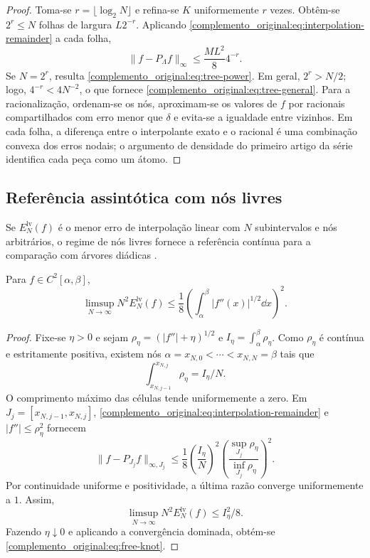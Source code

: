 \begin{proof}
Toma-se $r=\lfloor\log_2N\rfloor$ e refina-se $K$ uniformemente $r$ vezes. Obtêm-se $2^r\le N$ folhas de largura $L2^{-r}$. Aplicando \eqref{complemento_original:eq:interpolation-remainder} a cada folha,
\[
 \|f-P_\Lambda f\|_\infty\le\frac{ML^2}{8}4^{-r}.
\]
Se $N=2^r$, resulta \eqref{complemento_original:eq:tree-power}. Em geral, $2^r>N/2$; logo, $4^{-r}<4N^{-2}$, o que fornece \eqref{complemento_original:eq:tree-general}. Para a racionalização, ordenam-se os nós, aproximam-se os valores de $f$ por racionais compartilhados com erro menor que $\delta$ e evita-se a igualdade entre vizinhos. Em cada folha, a diferença entre o interpolante exato e o racional é uma combinação convexa dos erros nodais; o argumento de densidade do primeiro artigo da série identifica cada peça como um átomo.
\end{proof}

\subsection{Referência assintótica com nós livres}

Se $E_N^{\mathrm{lv}}(f)$ é o menor erro de interpolação linear com $N$
subintervalos e nós arbitrários, o regime de nós livres fornece a referência
contínua para a comparação com árvores diádicas
\citep{artigo_1-deboor1973,artigo_1-burchard1974,artigo_1-deboor2001,artigo_1-powell1981,artigo_1-schumaker2007}.

\begin{theorem}\label{map:complemento_original:6.2}\label{complemento_original:thm:free-knots}
Para $f\in C^2[\alpha,\beta]$,
\begin{equation}
 \limsup_{N\to\infty}N^2E_N^{\mathrm{lv}}(f)
 \le\frac18\left(\int_\alpha^\beta |f''(x)|^{1/2}\dd x\right)^2.
 \label{complemento_original:eq:free-knot}
\end{equation}
\end{theorem}

\begin{proof}
Fixe-se $\eta>0$ e sejam $\rho_\eta=(|f''|+\eta)^{1/2}$ e $I_\eta=\int_\alpha^\beta\rho_\eta$. Como $\rho_\eta$ é contínua e estritamente positiva, existem nós $\alpha=x_{N,0}<\cdots<x_{N,N}=\beta$ tais que
\[
 \int_{x_{N,j-1}}^{x_{N,j}}\rho_\eta=I_\eta/N.
\]
O comprimento máximo das células tende uniformemente a zero. Em $J_j=[x_{N,j-1},x_{N,j}]$, \eqref{complemento_original:eq:interpolation-remainder} e $|f''|\le\rho_\eta^2$ fornecem
\[
 \|f-P_{J_j}f\|_{\infty,J_j}
 \le\frac18\left(\frac{I_\eta}{N}\right)^2
 \left(\frac{\sup_{J_j}\rho_\eta}{\inf_{J_j}\rho_\eta}\right)^2.
\]
Por continuidade uniforme e positividade, a última razão converge uniformemente a $1$. Assim,
\[
 \limsup_{N\to\infty}N^2E_N^{\mathrm{lv}}(f)\le I_\eta^2/8.
\]
Fazendo $\eta\downarrow0$ e aplicando a convergência dominada, obtém-se \eqref{complemento_original:eq:free-knot}.
\end{proof}

